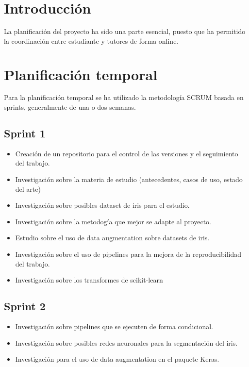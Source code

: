 
\section{Introducción}

La planificación del proyecto ha sido una parte esencial, puesto que ha permitido la coordinación entre estudiante y tutores de forma online.

\section{Planificación temporal}

Para la planificación temporal se ha utilizado la metodología SCRUM basada en sprints, generalmente de una o dos semanas.

\subsection{Sprint 1}

\begin{itemize}
\item Creación de un repositorio para el control de las versiones y el seguimiento del trabajo.
\item Investigación sobre la materia de estudio (antecedentes, casos de uso, estado del arte)
\item Investigación sobre posibles dataset de iris para el estudio.
\item Investigación sobre la metodogía que mejor se adapte al proyecto.
\item Estudio sobre el uso de data augmentation sobre datasets de iris.
\item Investigación sobre el uso de pipelines para la mejora de la reproducibilidad del trabajo.
\item Investigación sobre los transformes de scikit-learn
\end{itemize}

\subsection{Sprint 2}

\begin{itemize}
\item Investigación sobre pipelines que se ejecuten de forma condicional.
\item Investigación sobre posibles redes neuronales para la segmentación del iris.
\item Investigación para el uso de data augmentation en el paquete Keras.
\end{itemize}

